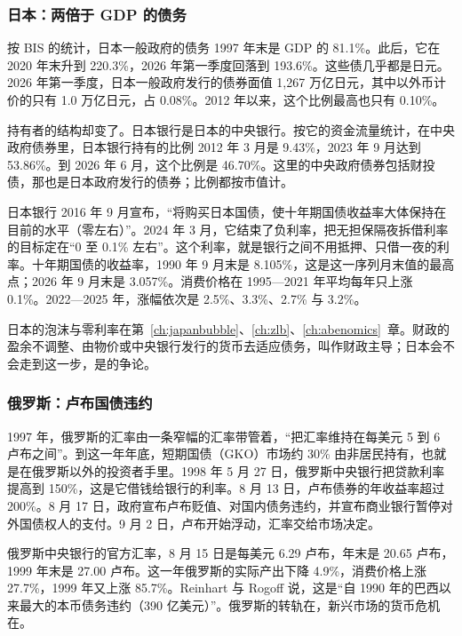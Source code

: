 \subsubsection{日本：两倍于 GDP 的债务}
按 BIS 的统计，日本一般政府的债务 1997 年末是 GDP 的 81.1\%。此后，它在 2020 年末升到 220.3\%，2026 年第一季度回落到 193.6\%\cite{bis2026}。这些债几乎都是日元。2026 年第一季度，日本一般政府发行的债券面值 1,267 万亿日元，其中以外币计价的只有 1.0 万亿日元，占 0.08\%。2012 年以来，这个比例最高也只有 0.10\%\cite{bis2026}。

持有者的结构却变了。日本银行是日本的中央银行。按它的资金流量统计，在中央政府债券里，日本银行持有的比例 2012 年 3 月是 9.43\%，2023 年 9 月达到 53.86\%。到 2026 年 6 月，这个比例是 46.70\%\cite{boj2026ff}。这里的中央政府债券包括财投债，那也是日本政府发行的债券；比例都按市值计。

日本银行 2016 年 9 月宣布，“将购买日本国债，使十年期国债收益率大体保持在目前的水平（零左右）”\cite{boj2016b}。2024 年 3 月，它结束了负利率，把无担保隔夜拆借利率的目标定在“0 至 0.1\% 左右”\cite{boj2024}。这个利率，就是银行之间不用抵押、只借一夜的利率。十年期国债的收益率，1990 年 9 月末是 8.105\%，这是这一序列月末值的最高点；2026 年 9 月末是 3.057\%\cite{mof2026}。消费价格在 1995—2021 年平均每年只上涨 0.1\%。2022—2025 年，涨幅依次是 2.5\%、3.3\%、2.7\% 与 3.2\%\cite{wdi2026}。

日本的泡沫与零利率在第~\ref{ch:japanbubble}、\ref{ch:zlb}、\ref{ch:abenomics}~章。财政的盈余不调整、由物价或中央银行发行的货币去适应债务，叫作财政主导；日本会不会走到这一步，是的争论。

\subsubsection{俄罗斯：卢布国债违约}
1997 年，俄罗斯的汇率由一条窄幅的汇率带管着，“把汇率维持在每美元 5 到 6 卢布之间”。到这一年年底，短期国债（GKO）市场约 30\% 由非居民持有，也就是在俄罗斯以外的投资者手里\cite{chiodo2002}。1998 年 5 月 27 日，俄罗斯中央银行把贷款利率提高到 150\%，这是它借钱给银行的利率。8 月 13 日，卢布债券的年收益率超过 200\%。8 月 17 日，政府宣布卢布贬值、对国内债务违约，并宣布商业银行暂停对外国债权人的支付。9 月 2 日，卢布开始浮动，汇率交给市场决定\cite{chiodo2002}。

俄罗斯中央银行的官方汇率，8 月 15 日是每美元 6.29 卢布，年末是 20.65 卢布，1999 年末是 27.00 卢布\cite{cbr2026}。这一年俄罗斯的实际产出下降 4.9\%\cite{chiodo2002}，消费价格上涨 27.7\%，1999 年又上涨 85.7\%\cite{wdi2026}。Reinhart 与 Rogoff 说，这是“自 1990 年的巴西以来最大的本币债务违约（390 亿美元）”\cite{reinhart2008}。俄罗斯的转轨在，新兴市场的货币危机在。

